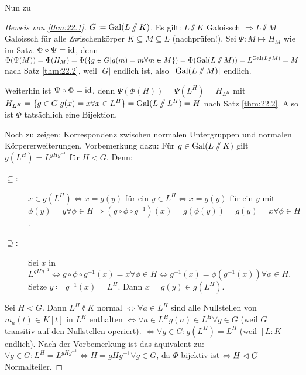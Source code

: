 \documentclass[12pt,a4paper]{scrartcl}
\begin{document}
\noindent Nun zu
\begin{proof}[Beweis von \ref{thm:22.1}]
$G\coloneqq \operatorname{Gal}(L\sslash K)$. Es gilt: $L\sslash K$ Galoissch $\Rightarrow L\sslash M$ Galoissch für alle Zwischenkörper $K\subseteq M\subseteq L$ (nachprüfen!). Sei $\Psi \colon M\mapsto H_M$ wie im Satz. $\Phi\circ\Psi = \operatorname{id}$, denn $\Phi(\Psi(M)) =\Phi( H_M )= \Phi(\{g\in G|g(m) = m\forall m\in M\} )= \Phi(\operatorname{Gal}(L\sslash M)) = L^{\operatorname{Gal}(L\sslash M)} = M$ nach Satz \ref{thm:22.2}, weil $|G|$ endlich ist, also $|\operatorname{Gal}(L\sslash M)|$ endlich.

Weiterhin ist $\Psi\circ\Phi = \operatorname{id}$, denn $\Psi(\Phi(H)) = \Psi(L^H) =H_{L^H}$ mit $H_{L^H} = \{g\in G|g(x) = x\forall x\in L^H\} = \operatorname{Gal}(L\sslash L^H) = H$ nach Satz \ref{thm:22.2}. Also ist $\Phi$ tatsächlich eine Bijektion.

Noch zu zeigen: Korrespondenz zwischen normalen Untergruppen und normalen Körpererweiterungen. Vorbemerkung dazu: Für $g\in \operatorname{Gal}(L\sslash K)$ gilt $g(L^H) =L^{gHg^{-1}}$ für $H<G$. Denn:
\begin{description}
	\item[\glqq$\subseteq$\grqq:] $x\in g(L^H)\Leftrightarrow x = g(y)$ für ein $y\in L^H \Leftrightarrow x = g(y)$ für ein $y$ mit $\phi(y) = y\forall \phi\in H\Rightarrow (g\circ \phi\circ g^{-1}) (x) = g(\phi(y))  = g(y) = x\forall \phi\in H$.
	\item[\glqq$\supseteq$\grqq:] Sei $x$ in $L^{gHg^{-1}}\Leftrightarrow g\circ\phi\circ g^{-1}(x) = x\forall \phi\in H\Leftrightarrow g^{-1}(x) = \phi(g^{-1}(x))\forall \phi\in H$. Setze $y\coloneqq g^{-1}(x) = L^H$. Dann $x = g(y)\in g(L^H)$. 
\end{description}
Sei $H<G$. Dann $L^H\sslash K$ normal $\Leftrightarrow \forall a\in L^H$ sind alle Nullstellen von $m_a(t)\in K[t]$ in $L^H$ enthalten $\Leftrightarrow \forall a\in L^H g(a) \in L^H\forall g\in G$ (weil $G$ transitiv auf den Nullstellen operiert). $\Leftrightarrow \forall g\in G: g(L^H) = L^H$ (weil $[L:K]$ endlich). Nach der Vorbemerkung ist das äquivalent zu: $\forall g\in G: L^H = L^{gHg^{-1}} \Leftrightarrow H = gHg^{-1}\forall g\in G$, da $\Phi$ bijektiv ist $\Leftrightarrow H\vartriangleleft G$ Normalteiler.


\end{proof}
\end{document}
